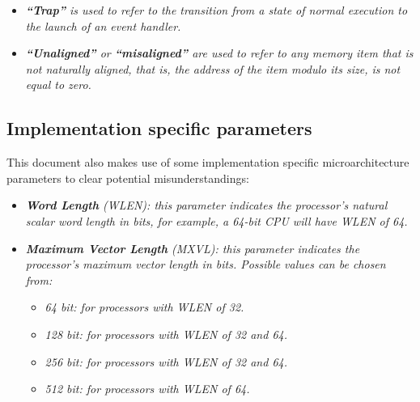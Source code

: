 \documentclass{article}
\begin{document}
\begin{itemize}
                \item \textit{\textbf{``Trap''} is used to refer to the transition from a state of normal execution to the launch of an event handler.}

                \item \textit{\textbf{``Unaligned''} or \textbf{``misaligned''} are used to refer to any memory item that is not naturally aligned, that is, the address of the item modulo its size, is not equal to zero.}

            \end{itemize}

        \subsection[Implementation specific parameters]{Implementation specific parameters}

            \vspace{10pt}

            This document also makes use of some implementation specific microarchitecture parameters to clear potential misunderstandings:

            \begin{itemize}

                \item \textit{\textbf{Word Length} (WLEN): this parameter indicates the processor's natural scalar word length in bits, for example, a 64-bit CPU will have WLEN of 64.}

                \item \textit{\textbf{Maximum Vector Length} (MXVL): this parameter indicates the processor's maximum vector length in bits. Possible values can be chosen from:}

                    \begin{itemize}

                        \item \textit{64 bit: for processors with WLEN of 32.}
                        \item \textit{128 bit: for processors with WLEN of 32 and 64.}
                        \item \textit{256 bit: for processors with WLEN of 32 and 64.}
                        \item \textit{512 bit: for processors with WLEN of 64.}

                    \end{itemize}

            \end{itemize}
\end{document}
